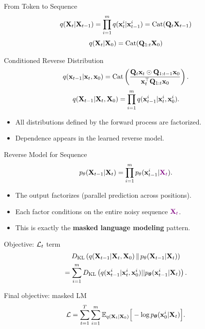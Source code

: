 \documentclass{beamer}
\begin{document}
\begin{frame}{From Token to Sequence}
    \[
        q(\mathbf{X}_t |\mathbf{X}_{t-1}) =
		\prod_{i=1}^m q(\mathbf{x}_t^i |\mathbf{x}_{t-1}^i) = \operatorname{Cat}(\mathbf{Q}_t \mathbf{X}_{t-1})
    \]
    \eqpause
    \[
        q(\mathbf{X}_t |\mathbf{X}_0) = \operatorname{Cat}(\mathbf{Q}_{1:t} \mathbf{X}_0)
    \]
    \vspace{-0.3cm}
    \eqpause
    \begin{block}{Conditioned Reverse Distribution}
        \[
            q(\mathbf{x}_{t-1} | \mathbf{x}_t, \mathbf{x}_0)
			= \operatorname{Cat}\left(\frac{\mathbf{Q}_t \mathbf{x}_t \odot \mathbf{Q}_{1:t-1} \mathbf{x}_0}{\mathbf{x}_t^{\top}\mathbf{Q}_{1:t}\mathbf{x}_0}\right).
        \]
        \vspace{-0.3cm}
        \[
            q(\mathbf{X}_{t-1} | \mathbf{X}_t, \mathbf{X}_0) =
            \prod_{i=1}^m q(\mathbf{x}_{t-1}^i |\mathbf{x}_t^i, \mathbf{x}_0^i).
        \]
        \vspace{-0.3cm}
    \end{block}
    \eqpause
    \begin{itemize}
        \item All distributions defined by the forward process are factorized.
        \item Dependence appears in the learned reverse model.
    \end{itemize}
\end{frame}
\begin{frame}{Reverse Model for Sequence}
    \[
        p_\theta(\mathbf{X}_{t-1}|\mathbf{X}_t) =
		\prod_{i=1}^m p_\theta(\mathbf{x}_{t-1}^i | {\color{violet}\mathbf{X}_t}).
    \]
    \vspace{-0.3cm}
    \begin{itemize}
        \item The output factorizes (parallel prediction across positions).
        \item Each factor conditions on the entire noisy sequence ${\color{violet}\mathbf{X}_t}$.
        \item This is exactly the \textbf{masked language modeling} pattern.
    \end{itemize}
    \eqpause
    \begin{block}{Objective: $\mathcal{L}_t$ term}
        \vspace{-0.7cm}
        \begin{multline*}
			D_\mathrm{KL}\left(q(\mathbf{X}_{t-1}| \mathbf{X}_t, \mathbf{X}_0)\,\|\,p_\theta(\mathbf{X}_{t-1}| \mathbf{X}_t)\right) \\
			= \sum_{i=1}^m D_\mathrm{KL}\left(q(\mathbf{x}_{t-1}^i|\mathbf{x}_t^i, \mathbf{x}_0^i) || p_{\boldsymbol{\theta}}(\mathbf{x}_{t-1}^i|\mathbf{X}_t)\right).
        \end{multline*}
        \vspace{-0.5cm}
    \end{block}
    \eqpause
    \begin{block}{Final objective: masked LM}
        \vspace{-0.3cm}
        \[
            \mathcal{L} =
            \sum_{t=1}^T \sum_{i=1}^m
            \mathbb{E}_{q(\mathbf{X}_t|\mathbf{X}_0)}
            \Big[-\log p_{\boldsymbol{\theta}}(\mathbf{x}_0^i |\mathbf{X}_t)\Big].
        \]
    \end{block}
\end{frame}
\end{document}

